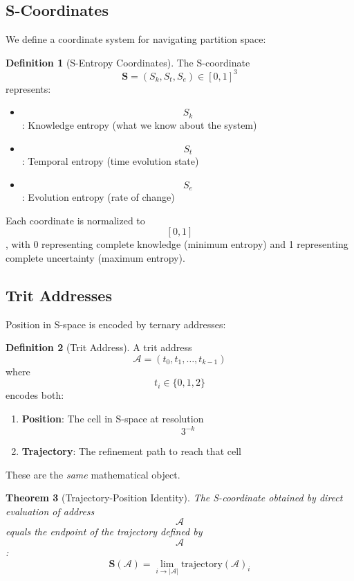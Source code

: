 \documentclass[11pt,twocolumn,a4paper]{article}
\newtheorem{theorem}{Theorem}[section]
\theoremstyle{definition}
\newtheorem{definition}[theorem]{Definition}
\theoremstyle{remark}
\newcommand{\Scoord}{\mathbf{S}}
\begin{document}
\subsection{S-Coordinates}

We define a coordinate system for navigating partition space:

\begin{definition}[S-Entropy Coordinates]
The S-coordinate $$\Scoord = (S_k, S_t, S_e) \in [0,1]^3$$ represents:
\begin{itemize}
    \item $$S_k$$: Knowledge entropy (what we know about the system)
    \item $$S_t$$: Temporal entropy (time evolution state)
    \item $$S_e$$: Evolution entropy (rate of change)
\end{itemize}
Each coordinate is normalized to $$[0,1]$$, with 0 representing complete knowledge (minimum entropy) and 1 representing complete uncertainty (maximum entropy).
\end{definition}

\subsection{Trit Addresses}

Position in S-space is encoded by ternary addresses:

\begin{definition}[Trit Address]
A trit address $$\mathcal{A} = (t_0, t_1, \ldots, t_{k-1})$$ where $$t_i \in \{0, 1, 2\}$$ encodes both:
\begin{enumerate}
    \item \textbf{Position}: The cell in S-space at resolution $$3^{-k}$$
    \item \textbf{Trajectory}: The refinement path to reach that cell
\end{enumerate}
These are the \emph{same} mathematical object.
\end{definition}

\begin{theorem}[Trajectory-Position Identity]
\label{thm:trajectory_position}
The S-coordinate obtained by direct evaluation of address $$\mathcal{A}$$ equals the endpoint of the trajectory defined by $$\mathcal{A}$$:
\begin{equation}
\Scoord(\mathcal{A}) = \lim_{i \to |\mathcal{A}|} \text{trajectory}(\mathcal{A})_i
\end{equation}
\end{theorem}
\end{document}
